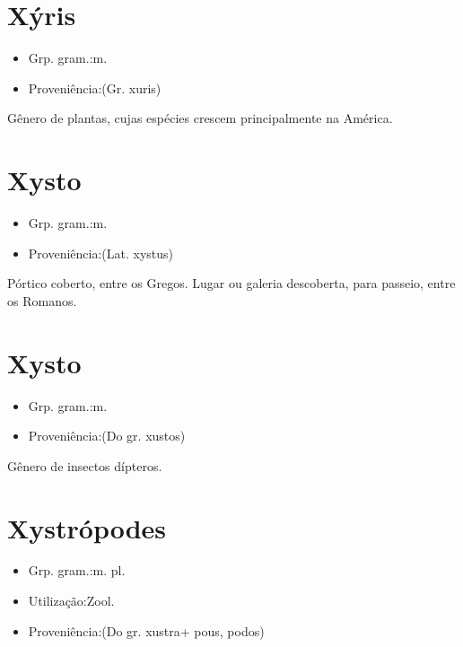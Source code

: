 \section{Xýris}
\begin{itemize}
\item {Grp. gram.:m.}
\end{itemize}
\begin{itemize}
\item {Proveniência:(Gr. \textunderscore xuris\textunderscore )}
\end{itemize}
Gênero de plantas, cujas espécies crescem principalmente na América.
\section{Xysto}
\begin{itemize}
\item {Grp. gram.:m.}
\end{itemize}
\begin{itemize}
\item {Proveniência:(Lat. \textunderscore xystus\textunderscore )}
\end{itemize}
Pórtico coberto, entre os Gregos.
Lugar ou galeria descoberta, para passeio, entre os Romanos.
\section{Xysto}
\begin{itemize}
\item {Grp. gram.:m.}
\end{itemize}
\begin{itemize}
\item {Proveniência:(Do gr. \textunderscore xustos\textunderscore )}
\end{itemize}
Gênero de insectos dípteros.
\section{Xystrópodes}
\begin{itemize}
\item {Grp. gram.:m. pl.}
\end{itemize}
\begin{itemize}
\item {Utilização:Zool.}
\end{itemize}
\begin{itemize}
\item {Proveniência:(Do gr. \textunderscore xustra\textunderscore  + \textunderscore pous\textunderscore , \textunderscore podos\textunderscore )}
\end{itemize}
